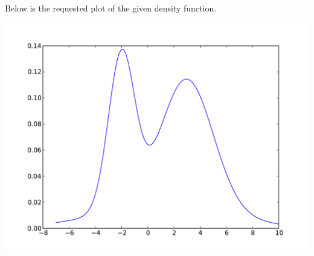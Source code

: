 \documentclass[solution, letterpaper]{cs121}
\begin{document}
\begin{empfile}
\subproblem %
Below is the requested plot of the given density function.
\begin{center}
\includegraphics[scale=0.8]{mixture-o-gaussians.pdf}
\end{center}


\end{empfile}
\end{document}
